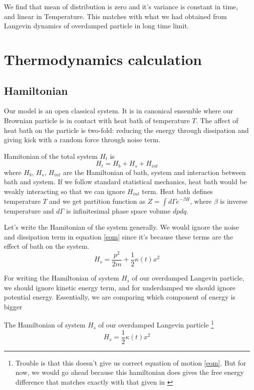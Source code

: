 \documentclass[11pt,a4paper]{article}
\begin{document}
We find that mean of distribution is zero and it's variance is constant in time, and linear in Temperature. This matches with what we had obtained from Langevin dynamics of overdamped particle in long time limit. 
\section{Thermodynamics calculation}
\subsection*{Hamiltonian}
Our model is an open classical system. It is in canonical ensemble where our Brownian particle is in contact with heat bath of temperature $T$. The affect of heat bath on the particle is two-fold: reducing the energy through dissipation and giving kick with a random force through noise term.

Hamitonian of the total system $H_t$ is 
\begin{equation}
H_t = H_b + H_s + H_{int}
\end{equation}
where $H_b$, $H_s$, $H_{int}$ are the Hamiltonian of bath, system and interaction between bath and system. If we follow standard statistical mechanics, heat bath would be weakly interacting so that we can ignore $H_{int}$ term. Heat bath defines temperature $T$ and we get partition function as $ Z= \int d\Gamma e^{-\beta H}$, where $\beta$ is inverse temperature and $d\Gamma$ is infinitesimal phase space volume $dpdq$.

Let's write the Hamitonian of the system generally. We would ignore the noise and dissipation term in equation \ref{eom} since it's because these terms are the effect of bath on the system.
\begin{equation}
H_s = \dfrac{p^2}{2m}   +\dfrac{1}{2} \kappa(t) x^2
\end{equation}

For writing the Hamiltonian of system $H_s$ of our overdamped Langevin particle,  we should ignore kinetic energy term, and for underdamped we should ignore potential energy. Essentially, we are comparing which component of energy is bigger


The Hamiltonian of system $H_s$ of our overdamped Langevin particle \footnote{Trouble is that this doesn't give us correct equation of motion \ref{eom}. But for now, we would go ahead because this hamiltonian does gives the free energy difference that matches exactly with that given in \cite{martinez2016engineered} }
\begin{equation}
H_s = \dfrac{1}{2} \kappa(t) x^2
\end{equation}
\end{document}
